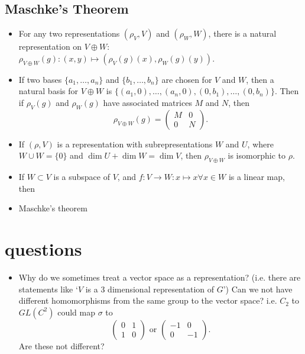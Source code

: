 \documentclass[a4paper]{article}
\begin{document}
\subsection{Maschke's Theorem}
\begin{itemize}
    \item For any two representations $(\rho_V, V)$ and $(\rho_W, W)$, there is a natural representation on $V \oplus W$: $\rho_{V \oplus W}(g): (x, y) \mapsto (\rho_V(g)(x), \rho_W(g)(y))$.
    \item If two bases $\{a_1, \hdots, a_n\}$ and $\{b_1, \hdots, b_n\}$ are chosen for $V$ and $W$, then a natural basis for $V \oplus W$ is $\{(a_1, 0), \hdots, (a_n,0), (0, b_1), \hdots, (0,b_n)\}$. Then if $\rho_V(g)$ and $\rho_W(g)$ have associated matrices $M$ and $N$, then $$\rho_{V \oplus W}(g) = \begin{pmatrix}M & 0 \\ 0 & N\end{pmatrix}.$$
    \item If $(\rho, V)$ is a representation with subrepresentations $W$ and $U$, where $W \cup W = \{0\}$ and $\dim U + \dim W = \dim V$, then $\rho_{V \oplus W}$ is isomorphic to $\rho$.
    \item If $W \subset V$ is a subspace of $V$, and $f : V \to W: x \mapsto x \forall x \in W$ is a linear map, then 
    \item Maschke's theorem
\end{itemize}

\newpage
\section{questions}
\begin{itemize}
    \item Why do we sometimes treat a vector space as a representation? (i.e. there are statements like `$V$ is a 3 dimensional representation of $G$') Can we not have different homomorphisms from the same group to the vector space? i.e. $C_2$ to $GL(C^2)$ could map $\sigma$ to $$\begin{pmatrix}0 & 1 \\ 1 & 0\end{pmatrix} \text{ or } \begin{pmatrix}-1 & 0 \\ 0 & -1\end{pmatrix}.$$ Are these not different? 
\end{itemize}
\end{document}

